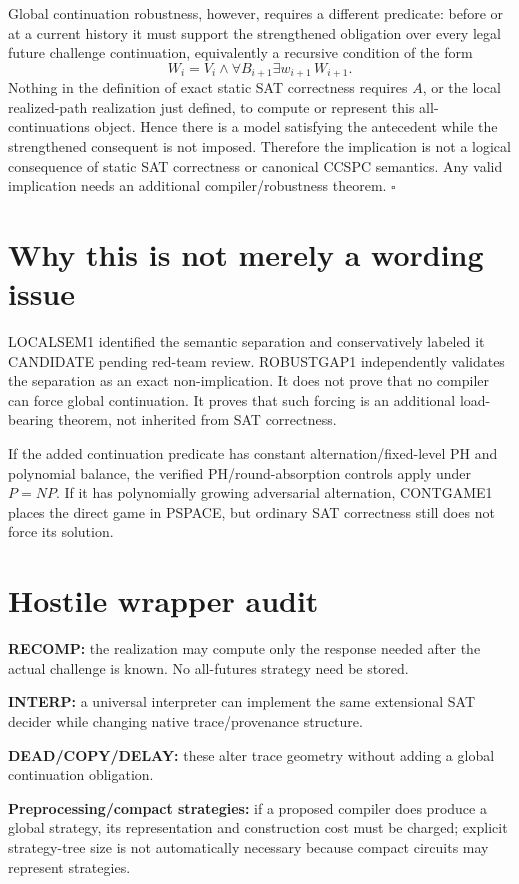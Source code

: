 \documentclass[11pt]{article}
\begin{document}
Global continuation robustness, however, requires a different predicate: before or at a current history it must support the strengthened obligation over every legal future challenge continuation, equivalently a recursive condition of the form
\[
W_i=V_i\wedge
\forall B_{i+1}\exists w_{i+1}\,W_{i+1}.
\]
Nothing in the definition of exact static SAT correctness requires \(A\), or the local realized-path realization just defined, to compute or represent this all-continuations object. Hence there is a model satisfying the antecedent while the strengthened consequent is not imposed. Therefore the implication is not a logical consequence of static SAT correctness or canonical CCSPC semantics. Any valid implication needs an additional compiler/robustness theorem. \(\square\)

\section*{Why this is not merely a wording issue}
LOCALSEM1 identified the semantic separation and conservatively labeled it CANDIDATE pending red-team review. ROBUSTGAP1 independently validates the separation as an exact non-implication. It does not prove that no compiler can force global continuation. It proves that such forcing is an additional load-bearing theorem, not inherited from SAT correctness.

If the added continuation predicate has constant alternation/fixed-level PH and polynomial balance, the verified PH/round-absorption controls apply under \(P=NP\). If it has polynomially growing adversarial alternation, CONTGAME1 places the direct game in PSPACE, but ordinary SAT correctness still does not force its solution.

\section*{Hostile wrapper audit}
\textbf{RECOMP:} the realization may compute only the response needed after the actual challenge is known. No all-futures strategy need be stored.

\textbf{INTERP:} a universal interpreter can implement the same extensional SAT decider while changing native trace/provenance structure.

\textbf{DEAD/COPY/DELAY:} these alter trace geometry without adding a global continuation obligation.

\textbf{Preprocessing/compact strategies:} if a proposed compiler does produce a global strategy, its representation and construction cost must be charged; explicit strategy-tree size is not automatically necessary because compact circuits may represent strategies.
\end{document}
